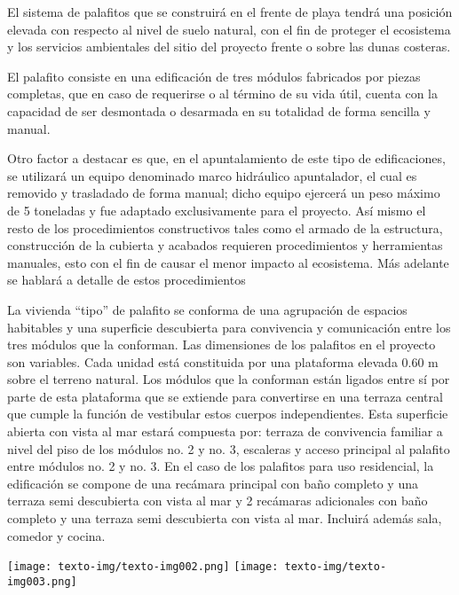 \documentclass{article}
\begin{document}
\bigskip

El sistema de palafitos que se construirá en el frente de playa tendrá una posición elevada con respecto al nivel de suelo natural, con el fin de proteger el ecosistema y los servicios ambientales del sitio del proyecto frente o sobre las dunas costeras. 


\bigskip

El palafito consiste en una edificación de tres módulos fabricados por piezas completas, que en caso de requerirse o al término de su vida útil, cuenta con la capacidad de ser desmontada o desarmada en su totalidad de forma sencilla y manual.


\bigskip

Otro factor a destacar es que, en el apuntalamiento de este tipo de edificaciones, se utilizará un equipo denominado marco hidráulico apuntalador, el cual es removido y trasladado de forma manual; dicho equipo ejercerá un peso máximo de 5 toneladas y fue adaptado exclusivamente para el proyecto. Así mismo el resto de los procedimientos constructivos tales como el armado de la estructura, construcción de la cubierta y acabados requieren procedimientos y herramientas manuales, esto con el fin de causar el menor impacto al ecosistema. Más adelante se hablará a detalle de estos procedimientos


\bigskip

La vivienda “tipo” de palafito se conforma de una agrupación de espacios habitables y una superficie descubierta para convivencia y comunicación entre los tres módulos que la conforman. Las dimensiones de los palafitos en el proyecto son variables. Cada unidad está constituida por una plataforma elevada 0.60 m sobre el terreno natural. Los módulos que la conforman están ligados entre sí por parte de esta plataforma que se extiende para convertirse en una terraza central que cumple la función de vestibular estos cuerpos independientes. Esta superficie abierta con vista al mar estará compuesta por: terraza de convivencia familiar a nivel del piso de los módulos no. 2 y no. 3, escaleras y acceso principal al palafito entre módulos no. 2 y no. 3. En el caso de los palafitos para uso residencial, la edificación se compone de una recámara principal con baño completo y una terraza semi descubierta con vista al mar y 2 recámaras adicionales con baño completo y una terraza semi descubierta con vista al mar. Incluirá además sala, comedor y cocina.

 \texttt{[image: texto-img/texto-img002.png]}  \texttt{[image: texto-img/texto-img003.png]} 
\end{document}
